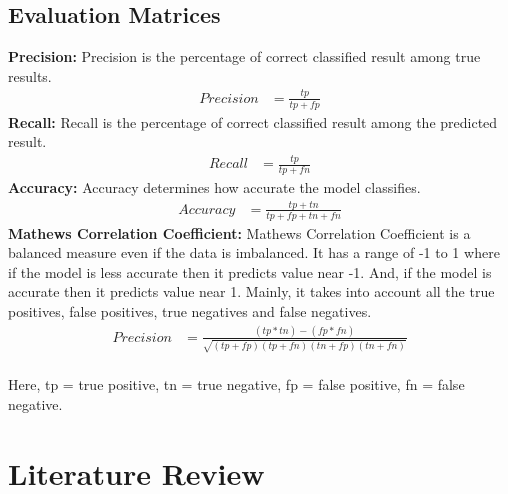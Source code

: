 \subsection{Evaluation Matrices}
\textbf{Precision:} Precision is the percentage of correct classified result among true results.
\begin{equation} \label{eq1}
\begin{split}
Precision & = \frac{tp}{tp+fp}
\end{split}
\end{equation}
\textbf{Recall:} Recall is the percentage of correct classified result among the predicted result.
\begin{equation} \label{eq2}
\begin{split}
Recall & = \frac{tp}{tp+fn}
\end{split}
\end{equation}
\textbf{Accuracy:} Accuracy determines how accurate the model classifies.
\begin{equation} \label{eq3}
\begin{split}
Accuracy & = \frac{tp+tn}{tp+fp+tn+fn}
\end{split}
\end{equation}
\textbf{Mathews Correlation Coefficient:} Mathews Correlation Coefficient is a balanced measure even if the data is imbalanced. It has a range of -1 to 1 where if the model is less accurate then it predicts value near -1. And, if the model is accurate then it predicts value near 1. Mainly, it takes into account all the true positives, false positives, true negatives and false negatives.
\begin{equation} \label{eq4}
\begin{split}
Precision & = \frac{(tp*tn)-(fp*fn)}{\sqrt{(tp+fp)(tp+fn)(tn+fp)(tn+fn)}}
\end{split}
\end{equation}
\\[2pt]
Here, tp = true positive, tn = true negative, fp = false positive, fn = false negative.
\section{Literature Review}
\label{lit_rev}
